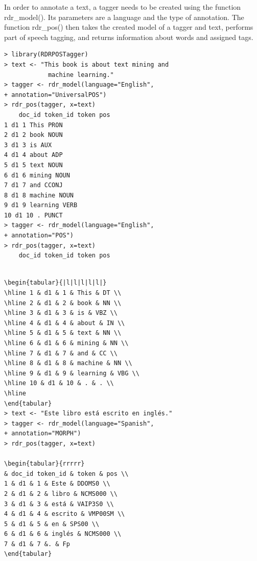 \documentclass[10pt]{book}
\begin{document}
In order to annotate a text, a tagger needs to be created using the function rdr\_model(). Its parameters are a language and the type of annotation. The function rdr\_pos() then takes the created model of a tagger and text, performs part of speech tagging, and returns information about words and assigned tags.

\begin{verbatim}
> library(RDRPOSTagger)
> text <- "This book is about text mining and
            machine learning."
> tagger <- rdr_model(language="English",
+ annotation="UniversalPOS")
> rdr_pos(tagger, x=text)
    doc_id token_id token pos
1 d1 1 This PRON
2 d1 2 book NOUN
3 d1 3 is AUX
4 d1 4 about ADP
5 d1 5 text NOUN
6 d1 6 mining NOUN
7 d1 7 and CCONJ
8 d1 8 machine NOUN
9 d1 9 learning VERB
10 d1 10 . PUNCT
> tagger <- rdr_model(language="English",
+ annotation="POS")
> rdr_pos(tagger, x=text)
    doc_id token_id token pos
\end{verbatim}

\begin{verbatim}

\begin{tabular}{|l|l|l|l|l|}
\hline 1 & d1 & 1 & This & DT \\
\hline 2 & d1 & 2 & book & NN \\
\hline 3 & d1 & 3 & is & VBZ \\
\hline 4 & d1 & 4 & about & IN \\
\hline 5 & d1 & 5 & text & NN \\
\hline 6 & d1 & 6 & mining & NN \\
\hline 7 & d1 & 7 & and & CC \\
\hline 8 & d1 & 8 & machine & NN \\
\hline 9 & d1 & 9 & learning & VBG \\
\hline 10 & d1 & 10 & . & . \\
\hline
\end{tabular}
> text <- "Este libro está escrito en inglés."
> tagger <- rdr_model(language="Spanish",
+ annotation="MORPH")
> rdr_pos(tagger, x=text)

\begin{tabular}{rrrrr} 
& doc_id token_id & token & pos \\
1 & d1 & 1 & Este & DDOMS0 \\
2 & d1 & 2 & libro & NCMS000 \\
3 & d1 & 3 & está & VAIP3S0 \\
4 & d1 & 4 & escrito & VMP00SM \\
5 & d1 & 5 & en & SPS00 \\
6 & d1 & 6 & inglés & NCMS000 \\
7 & d1 & 7 &. & Fp
\end{tabular}
\end{verbatim}
\end{document}
